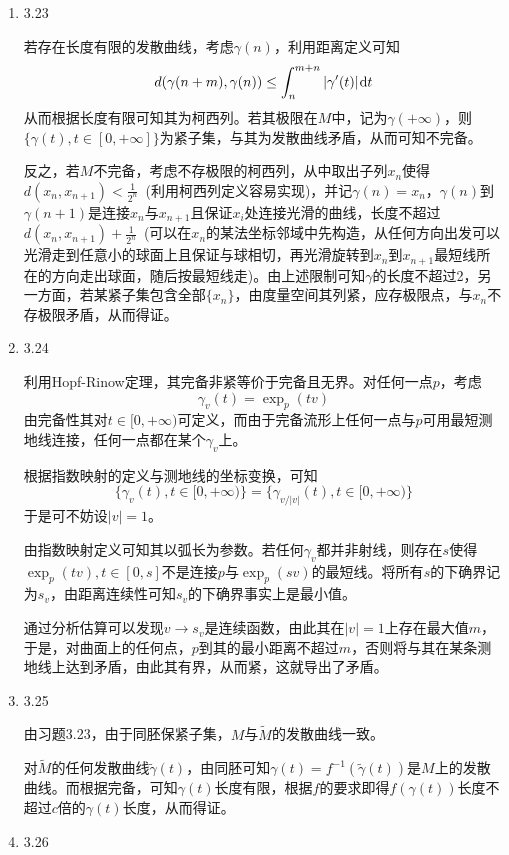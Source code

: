 \documentclass[a4paper,UTF8,fontset=windows,10pt]{ctexart}
\newcommand*{\dr}{\hspace{0.07em}\mathrm{d}}
\begin{document}
\begin{enumerate}
    \item 3.23
    
    若存在长度有限的发散曲线，考虑$\gamma(n)$，利用距离定义可知
    $$d(\gamma(n+m),\gamma(n))\le\int_n^{m+n}|\gamma'(t)|\dr t$$
    从而根据长度有限可知其为柯西列。若其极限在$M$中，记为$\gamma(+\infty)$，则$\{\gamma(t),t\in[0,+\infty]\}$为紧子集，与其为发散曲线矛盾，从而可知不完备。
    
    反之，若$M$不完备，考虑不存极限的柯西列，从中取出子列$x_n$使得$d(x_n,x_{n+1})<\frac{1}{2^n}$\ (利用柯西列定义容易实现)，并记$\gamma(n)=x_n$，$\gamma(n)$到$\gamma(n+1)$是连接$x_n$与$x_{n+1}$且保证$x_i$处连接光滑的曲线，长度不超过$d(x_n,x_{n+1})+\frac{1}{2^n}$\ (可以在$x_n$的某法坐标邻域中先构造，从任何方向出发可以光滑走到任意小的球面上且保证与球相切，再光滑旋转到$x_n$到$x_{n+1}$最短线所在的方向走出球面，随后按最短线走)。由上述限制可知$\gamma$的长度不超过2，另一方面，若某紧子集包含全部$\{x_n\}$，由度量空间其列紧，应存极限点，与$x_n$不存极限矛盾，从而得证。
    
    \item 3.24
    
    利用Hopf-Rinow定理，其完备非紧等价于完备且无界。对任何一点$p$，考虑
    $$\gamma_v(t)=\exp_p(tv)$$
    由完备性其对$t\in[0,+\infty)$可定义，而由于完备流形上任何一点与$p$可用最短测地线连接，任何一点都在某个$\gamma_v$上。
    
    根据指数映射的定义与测地线的坐标变换，可知
    $$\{\gamma_v(t),t\in[0,+\infty)\}=\{\gamma_{v/|v|}(t),t\in[0,+\infty)\}$$
    于是可不妨设$|v|=1$。
    
    由指数映射定义可知其以弧长为参数。若任何$\gamma_v$都并非射线，则存在$s$使得$\exp_p(tv),t\in[0,s]$不是连接$p$与$\exp_p(sv)$的最短线。将所有$s$的下确界记为$s_v$，由距离连续性可知$s_v$的下确界事实上是最小值。
    
    通过分析估算可以发现$v\to s_v$是连续函数，由此其在$|v|=1$上存在最大值$m$，于是，对曲面上的任何点，$p$到其的最小距离不超过$m$，否则将与其在某条测地线上达到矛盾，由此其有界，从而紧，这就导出了矛盾。
    
    \item 3.25
    
    由习题3.23，由于同胚保紧子集，$M$与$\tilde{M}$的发散曲线一致。
    
    对$\tilde{M}$的任何发散曲线$\tilde\gamma(t)$，由同胚可知$\gamma(t)=f^{-1}(\tilde\gamma(t))$是$M$上的发散曲线。而根据完备，可知$\gamma(t)$长度有限，根据$f$的要求即得$f(\gamma(t))$长度不超过$c$倍的$\gamma(t)$长度，从而得证。
    
    \item 3.26
    

\end{enumerate}
\end{document}
